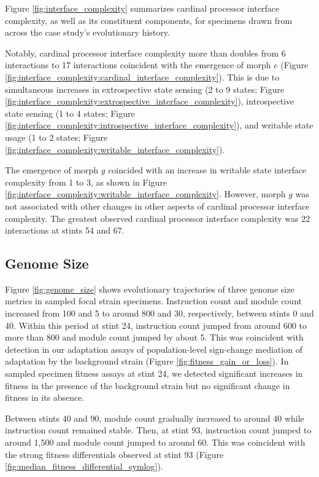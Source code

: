 Figure \ref{fig:interface_complexity} summarizes cardinal processor interface complexity, as well as its constituent components, for specimens drawn from across the case study's evolutionary history.

Notably, cardinal processor interface complexity more than doubles from 6 interactions to 17 interactions coincident with the emergence of morph $e$ (Figure \ref{fig:interface_complexity:cardinal_interface_complexity}).
This is due to simultaneous increases in extrospective state sensing (2 to 9 states; Figure \ref{fig:interface_complexity:extrospective_interface_complexity}), introspective state sensing (1 to 4 states; Figure \ref{fig:interface_complexity:introspective_interface_complexity}), and writable state usage (1 to 2 states; Figure \ref{fig:interface_complexity:writable_interface_complexity}).

The emergence of morph $g$ coincided with an increase in writable state interface complexity from 1 to 3, as shown in Figure \ref{fig:interface_complexity:writable_interface_complexity}.
However, morph $g$ was not associated with other changes in other aspects of cardinal processor interface complexity.
The greatest observed cardinal processor interface complexity was 22 interactions at stints 54 and 67.

\subsection{Genome Size}



Figure \ref{fig:genome_size} shows evolutionary trajectories of three genome size metrics in sampled focal strain specimens.
Instruction count and module count increased from 100 and 5 to around 800 and 30, respectively, between stints 0 and 40.
Within this period at stint 24, instruction count jumped from around 600 to more than 800 and module count jumped by about 5.
This was coincident with detection in our adaptation assays of population-level sign-change mediation of adaptation by the background strain (Figure \ref{fig:fitness_gain_or_loss}).
In sampled specimen fitness assays at stint 24, we detected significant increases in fitness in the presence of the background strain but no significant change in fitness in its absence.

Between stints 40 and 90, module count gradually increased to around 40 while instruction count remained stable.
Then, at stint 93, instruction count jumped to around 1,500 and module count jumped to around 60.
This was coincident with the strong fitness differentials observed at stint 93 (Figure \ref{fig:median_fitness_differential_symlog}).

